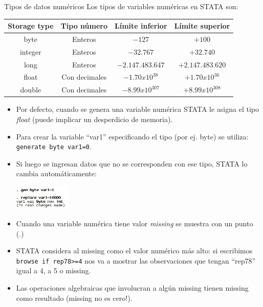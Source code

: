 \documentclass{beamer}
\begin{document}
\begin{frame}[allowframebreaks]{Tipos de datos numéricos}
Los tipos de variables numéricas en STATA  son:\\\medskip
\begin{tabular}{c c c c}
\hline
{\footnotesize Storage type}& {\footnotesize Tipo número}&{\footnotesize Límite inferior}& {\footnotesize Límite superior}\\\hline
{\footnotesize byte}& {\footnotesize Enteros} &{\footnotesize $-127$} &{\footnotesize $+100$}\\
{\footnotesize integer} &{\footnotesize Enteros}&{\footnotesize $-32.767$} &{\footnotesize $+32.740$}\\
{\footnotesize long} &{\footnotesize Enteros}&{\footnotesize $-2.147.483.647$} &{\footnotesize $+2.147.483.620$}\\
{\footnotesize float} &{\footnotesize Con decimales}&{\footnotesize $-1.70 x 10^{38}$}&{\footnotesize $+1.70 x 10^{36}$}\\
{\footnotesize double}& {\footnotesize Con decimales}&{\footnotesize $-8.99 x 10^{307}$}&{\footnotesize $+8.99 x 10^{308}$}\\\hline
\end{tabular}
\begin{itemize}
\item Por defecto, cuando se genera una variable numérica STATA le asigna el tipo \textit{float} (puede implicar un desperdicio de memoria). 
\item Para crear la variable ``var1'' especificando el tipo (por ej. byte) se utiliza: \texttt{generate byte var1=0}.
\item Si luego se ingresan datos que no se corresponden con ese tipo, STATA lo cambia automáticamente:\\
\centerline{\includegraphics[height=1.2cm]{byte.jpg}}
\item Cuando una variable numérica tiene valor \textit{missing} se muestra con un punto (.)
\item STATA considera al missing como el valor numérico más alto: si escribimos \texttt{browse if rep78>=4} nos va a mostrar las observaciones que tengan ``rep78'' igual a 4, a 5 o missing.
\item Las operaciones algebraicas que involucran a algún missing tienen missing como resultado (missing no es cero!).
\end{itemize}
\end{frame}
\end{document}
